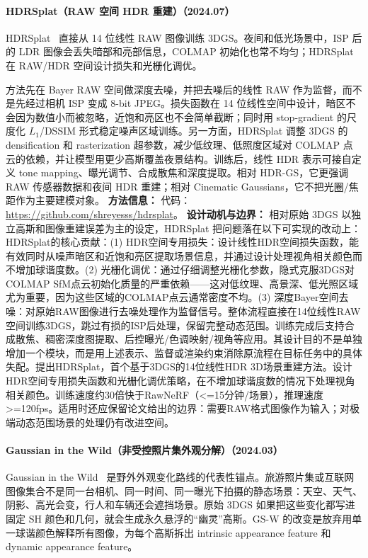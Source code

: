 \paragraph{HDRSplat（RAW 空间 HDR 重建）（2024.07）}
HDRSplat~\cite{2407_16503} 直接从 14 位线性 RAW 图像训练 3DGS。夜间和低光场景中，ISP 后的 LDR 图像会丢失暗部和亮部信息，COLMAP 初始化也常不均匀；HDRSplat 在 RAW/HDR 空间设计损失和光栅化调优。

方法先在 Bayer RAW 空间做深度去噪，并把去噪后的线性 RAW 作为监督，而不是先经过相机 ISP 变成 8-bit JPEG。损失函数在 14 位线性空间中设计，暗区不会因为数值小而被忽略，近饱和亮区也不会简单截断；同时用 stop-gradient 的尺度化 $L_1$/DSSIM 形式稳定噪声区域训练。另一方面，HDRSplat 调整 3DGS 的 densification 和 rasterization 超参数，减少低纹理、低照度区域对 COLMAP 点云的依赖，并让模型用更少高斯覆盖夜景结构。训练后，线性 HDR 表示可接自定义 tone mapping、曝光调节、合成散焦和深度提取。相对 HDR-GS，它更强调 RAW 传感器数据和夜间 HDR 重建；相对 Cinematic Gaussians，它不把光圈/焦距作为主要建模对象。
\textbf{方法信息：} 代码：\url{https://github.com/shreyesss/hdrsplat}。
\textbf{设计动机与边界：} 相对原始 3DGS 以独立高斯和图像重建误差为主的设定，HDRSplat 把问题落在以下可实现的改动上：HDRSplat的核心贡献：(1) HDR空间专用损失：设计线性HDR空间损失函数，能有效同时从噪声暗区和近饱和亮区提取场景信息，并通过设计处理视角相关颜色而不增加球谐度数。(2) 光栅化调优：通过仔细调整光栅化参数，隐式克服3DGS对COLMAP SfM点云初始化质量的严重依赖——这对低纹理、高景深、低光照区域尤为重要，因为这些区域的COLMAP点云通常密度不均。(3) 深度Bayer空间去噪：对原始RAW图像进行去噪处理作为监督信号。整体流程直接在14位线性RAW空间训练3DGS，跳过有损的ISP后处理，保留完整动态范围。训练完成后支持合成散焦、稠密深度图提取、后控曝光/色调映射/视角等应用。其设计目的不是单独增加一个模块，而是用上述表示、监督或渲染约束消除原流程在目标任务中的具体失配。提出HDRSplat，首个基于3DGS的14位线性HDR 3D场景重建方法。设计HDR空间专用损失函数和光栅化调优策略，在不增加球谐度数的情况下处理视角相关颜色。训练速度约30倍快于RawNeRF（<=15分钟/场景），推理速度>=120fps。适用时还应保留论文给出的边界：需要RAW格式图像作为输入；对极端动态范围场景的处理仍有改进空间。
\paragraph{Gaussian in the Wild（非受控照片集外观分解）（2024.03）}
Gaussian in the Wild~\cite{2403_15704} 是野外外观变化路线的代表性锚点。旅游照片集或互联网图像集合不是同一台相机、同一时间、同一曝光下拍摄的静态场景：天空、天气、阴影、高光会变，行人和车辆还会遮挡场景。原始 3DGS 如果把这些变化都写进固定 SH 颜色和几何，就会生成永久悬浮的“幽灵”高斯。GS-W 的改变是放弃用单一球谐颜色解释所有图像，为每个高斯拆出 intrinsic appearance feature 和 dynamic appearance feature。


